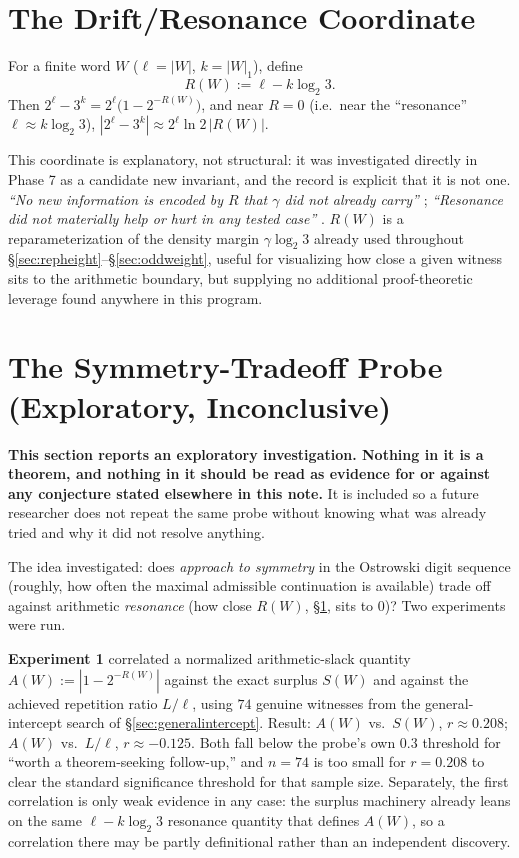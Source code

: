 \documentclass[11pt]{article}
\begin{document}
\section{The Drift/Resonance Coordinate}
\label{sec:drift}

For a finite word $W$ ($\ell=|W|$, $k=|W|_1$), define
\[
R(W) := \ell - k\log_2 3.
\]
Then $2^\ell - 3^k = 2^\ell\bigl(1-2^{-R(W)}\bigr)$, and near $R=0$ (i.e.\ near the ``resonance'' $\ell\approx k\log_2 3$), $|2^\ell-3^k| \approx 2^\ell \ln2\,|R(W)|$.

This coordinate is explanatory, not structural: it was investigated directly in Phase 7 as a candidate new invariant, and the record is explicit that it is not one. \emph{``No new information is encoded by $R$ that $\gamma$ did not already carry''} \cite{Phase7Drift}; \emph{``Resonance did not materially help or hurt in any tested case''} \cite{Phase7DriftDigits}. $R(W)$ is a reparameterization of the density margin $\gamma\log_2 3$ already used throughout \S\ref{sec:repheight}--\S\ref{sec:oddweight}, useful for visualizing how close a given witness sits to the arithmetic boundary, but supplying no additional proof-theoretic leverage found anywhere in this program.

\section{The Symmetry-Tradeoff Probe (Exploratory, Inconclusive)}
\label{sec:symmetryprobe}

\textbf{This section reports an exploratory investigation. Nothing in it is a theorem, and nothing in it should be read as evidence for or against any conjecture stated elsewhere in this note.} It is included so a future researcher does not repeat the same probe without knowing what was already tried and why it did not resolve anything.

The idea investigated: does \emph{approach to symmetry} in the Ostrowski digit sequence (roughly, how often the maximal admissible continuation is available) trade off against arithmetic \emph{resonance} (how close $R(W)$, \S\ref{sec:drift}, sits to $0$)? Two experiments were run.

\textbf{Experiment 1} correlated a normalized arithmetic-slack quantity $A(W):=|1-2^{-R(W)}|$ against the exact surplus $S(W)$ and against the achieved repetition ratio $L/\ell$, using $74$ genuine witnesses from the general-intercept search of \S\ref{sec:generalintercept}. Result: $A(W)$ vs.\ $S(W)$, $r\approx0.208$; $A(W)$ vs.\ $L/\ell$, $r\approx-0.125$. Both fall below the probe's own $0.3$ threshold for ``worth a theorem-seeking follow-up,'' and $n=74$ is too small for $r=0.208$ to clear the standard significance threshold for that sample size. Separately, the first correlation is only weak evidence in any case: the surplus machinery already leans on the same $\ell-k\log_2 3$ resonance quantity that defines $A(W)$, so a correlation there may be partly definitional rather than an independent discovery.
\end{document}

